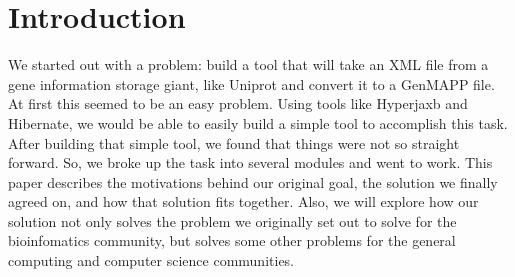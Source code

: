 \section{Introduction}
We started out with a problem: build a tool that will take an XML file from a gene information storage giant, like Uniprot and convert it to a GenMAPP file. At first this seemed to be an easy problem. Using tools like Hyperjaxb and Hibernate, we would be able to easily build a simple tool to accomplish this task. After building that simple tool, we found that things were not so straight forward. So, we broke up the task into several modules and went to work. This paper describes the motivations behind our original goal, the solution we finally agreed on, and how that solution fits together. Also, we will explore how our solution not only solves the problem we originally set out to solve for the bioinfomatics community, but solves some other problems for the general computing and computer science communities.

